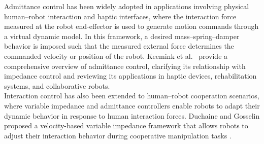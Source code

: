\documentclass[journal]{IEEEtran}
\begin{document}
Admittance control has been widely adopted in applications involving physical human--robot interaction and haptic interfaces, where the interaction force measured at the robot end-effector is used to generate motion commands through a virtual dynamic model. In this framework, a desired mass--spring--damper behavior is imposed such that the measured external force determines the commanded velocity or position of the robot. Keemink et al.~\cite{Keemink2018} provide a comprehensive overview of admittance control, clarifying its relationship with impedance control and reviewing its applications in haptic devices, rehabilitation systems, and collaborative robots. \\ 
Interaction control has also been extended to human–robot cooperation scenarios, where variable impedance and admittance controllers enable robots to adapt their dynamic behavior in response to human interaction forces. Duchaine and Gosselin proposed a velocity-based variable impedance framework that allows robots to adjust their interaction behavior during cooperative manipulation tasks \cite{Duchaine2007}.
\end{document}
